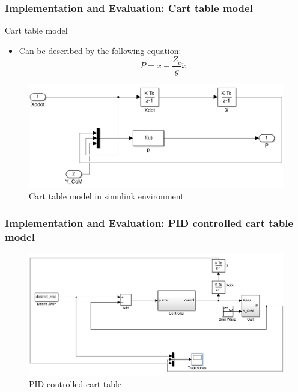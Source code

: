 \documentclass{beamer}
\begin{document}
\begin{frame}
	\frametitle{Implementation and Evaluation: Cart table model}
	\begin{block}{Cart table model}
		\begin{itemize}
			\item
				Can be described by the following equation:
				\begin{equation}
						P = x - \dfrac{Z_c}{g} \ddot{x}
				\end{equation}
		\end{itemize}
	\end{block}
	
	\begin{figure}[h!]
		\centering
		\includegraphics[width=0.8\linewidth]{presentation_images/18}
		\caption{Cart table model in simulink environment}
	\end{figure}
\end{frame}


	\begin{frame}
		\frametitle{Implementation and Evaluation: PID controlled cart table model}
		\begin{figure}[h!]
			\centering
			\includegraphics[width=\linewidth]{presentation_images/19}
			\caption{PID controlled cart table}
		\end{figure}
	\end{frame}
\end{document}
